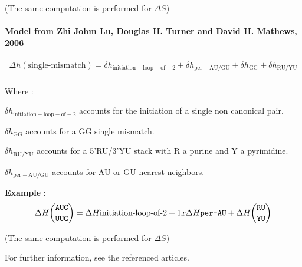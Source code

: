 \documentclass{article}
\begin{document}
       (The same computation is performed for $\Delta S$)
       

\paragraph{\textbf{Model from Zhi Johm Lu, Douglas H. Turner and David H. Mathews, 2006}}

\begin{multline*}
\Delta h {(\mbox{single-mismatch})} =
\delta{}h_\mathrm{initiation-loop-of-2} +
\delta{}h_\mathrm{per-AU/GU} +
\delta{}h_\mathrm{GG} +
\delta{}h_\mathrm{RU/YU}\\
\end{multline*}

Where :

$\delta{}h_\mathrm{initiation-loop-of-2}$ accounts for the initiation of a single non canonical pair.

$\delta{}h_\mathrm{GG}$ accounts for a GG single mismatch.

$\delta{}h_\mathrm{RU/YU}$ accounts for a 5'RU/3'YU stack with R a purine and Y a pyrimidine.

$\delta{}h_\mathrm{per-AU/GU}$ accounts for AU or GU nearest neighbors.

\textbf{Example} :
\begin{multline*}
\Delta H {\mbox{\texttt{AUC}} \choose \mbox{\texttt{UUG}}} =
\Delta H {\mbox{initiation-loop-of-2}} + 
1 x \Delta H {\mbox{\texttt{per-AU}} } +
\Delta H {\mbox{\texttt{RU}} \choose \mbox{\texttt{YU}} } \\
\end{multline*}

       (The same computation is performed for $\Delta S$)
       
For further information, see the referenced articles.
\end{document}
